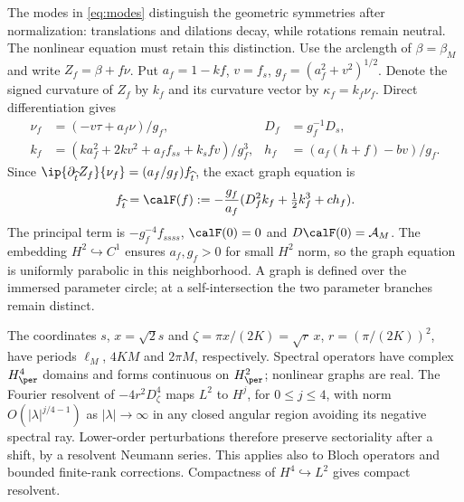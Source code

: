 The modes in \eqref{eq:modes} distinguish the geometric symmetries after normalization: translations and dilations decay, while rotations remain neutral. The nonlinear equation must retain this distinction. Use the arclength of $\beta=\beta_M$ and write $Z_f=\beta+f\nu$. Put $a_f=1-kf$, $v=f_s$, $g_f=(a_f^2+v^2)^{1/2}$. Denote the signed curvature of $Z_f$ by $k_f$ and its curvature vector by $\kappa_f=k_f\nu_f$. Direct differentiation gives
\begin{equation}\label{eq:graph-geometry}
 \begin{aligned}
 \nu_f&=(-v\tau+a_f\nu)/g_f,&D_f&=g_f^{-1}D_s,\\
 k_f&=(ka_f^2+2kv^2+a_ff_{ss}+k_sfv)/g_f^3,&
 h_f&=(a_f(h+f)-bv)/g_f.
 \end{aligned}
\end{equation}
Since $\ip{\partial_{\widehat t} Z_f}{\nu_f}=(a_f/g_f)f_{\widehat t}$, the exact graph equation is
\begin{equation}\label{eq:graph-flow}
 f_{\widehat t}=\calF(f):=-\frac{g_f}{a_f}
       (D_f^2k_f+\tfrac12k_f^3+ch_f).
\end{equation}
The principal term is $-g_f^{-4}f_{ssss}$, $\calF(0)=0$ and $D\calF(0)=\mathcal A_M$. The embedding $H^2\hookrightarrow C^1$ ensures $a_f,g_f>0$ for small $H^2$ norm, so the graph equation is uniformly parabolic in this neighborhood. A graph is defined over the immersed parameter circle; at a self-intersection the two parameter branches remain distinct.

The coordinates $s$, $x=\sqrt2s$ and $\zeta=\pi x/(2K)=\sqrt r\,x$, $r=(\pi/(2K))^2$, have periods $\ell_M$, $4KM$ and $2\pi M$, respectively. Spectral operators have complex $H^4_\per$ domains and forms continuous on $H^2_\per$; nonlinear graphs are real. The Fourier resolvent of $-4r^2D_\zeta^4$ maps $L^2$ to $H^j$, for $0\le j\le4$, with norm $O(|\lambda|^{j/4-1})$ as $|\lambda|\to\infty$ in any closed angular region avoiding its negative spectral ray. Lower-order perturbations therefore preserve sectoriality after a shift, by a resolvent Neumann series. This applies also to Bloch operators and bounded finite-rank corrections. Compactness of $H^4\hookrightarrow L^2$ gives compact resolvent.
